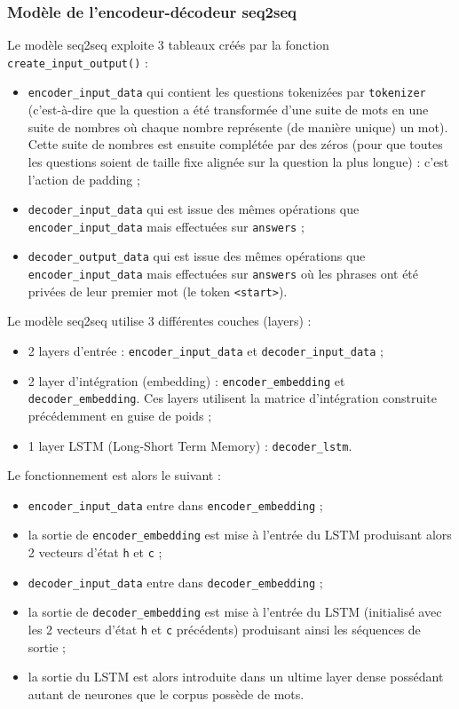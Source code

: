 \documentclass[10pt,a4paper]{article}
\newcommand\tab[1][0.5cm]{\hspace*{#1}}
\begin{document}
\subsubsection{Modèle de l'encodeur-décodeur seq2seq}
Le modèle seq2seq exploite 3 tableaux créés par la fonction \texttt{create\_input\_output()} :
\begin{itemize}
\item \texttt{encoder\_input\_data} qui contient les questions tokenizées par \texttt{tokenizer} (c'est-à-dire que la question a été transformée d'une suite de mots en une suite de nombres où chaque nombre représente (de manière unique) un mot). Cette suite de nombres est ensuite complétée par des zéros (pour que toutes les questions soient de taille fixe alignée sur la question la plus longue) : c'est l'action de padding ;
\item \texttt{decoder\_input\_data} qui est issue des mêmes opérations que \texttt{encoder\_input\_data} mais effectuées sur \texttt{answers} ;
\item \texttt{decoder\_output\_data} qui est issue des mêmes opérations que \texttt{encoder\_input\_data} mais effectuées sur \texttt{answers} où les phrases ont été privées de leur premier mot (le token \texttt{<start>}).
\end{itemize}
\tab Le modèle seq2seq utilise 3 différentes couches (layers) :
\begin{itemize}
\item 2 layers d'entrée : \texttt{encoder\_input\_data} et \texttt{decoder\_input\_data} ;
\item 2 layer d'intégration (embedding) : \texttt{encoder\_embedding} et \texttt{decoder\_embedding}. Ces layers utilisent la matrice d'intégration construite précédemment en guise de poids ;
\item 1 layer LSTM (Long-Short Term Memory) : \texttt{decoder\_lstm}.
\end{itemize}
Le fonctionnement est alors le suivant :
\begin{itemize}
\item \texttt{encoder\_input\_data} entre dans \texttt{encoder\_embedding} ;
\item la sortie de \texttt{encoder\_embedding} est mise à l'entrée du LSTM produisant alors 2 vecteurs d'état \texttt{h} et \texttt{c} ;
\item \texttt{decoder\_input\_data} entre dans \texttt{decoder\_embedding} ;
\item la sortie de \texttt{decoder\_embedding} est mise à l'entrée du LSTM (initialisé avec les 2 vecteurs d'état \texttt{h} et \texttt{c} précédents) produisant ainsi les séquences de sortie ;
\item la sortie du LSTM est alors introduite dans un ultime layer dense possédant autant de neurones que le corpus possède de mots.
\end{itemize}
\end{document}
